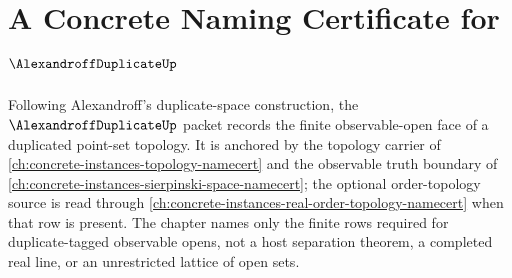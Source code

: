 \chapter{A Concrete Naming Certificate for $\AlexandroffDuplicateUp$}
\label{ch:concrete-instances-alexandroff-duplicate-namecert}

Following Alexandroff's duplicate-space construction, the $\AlexandroffDuplicateUp$ packet records the finite observable-open face of a duplicated point-set topology. It is anchored by the topology carrier of \autoref{ch:concrete-instances-topology-namecert} and the observable truth boundary of \autoref{ch:concrete-instances-sierpinski-space-namecert}; the optional order-topology source is read through \autoref{ch:concrete-instances-real-order-topology-namecert} when that row is present. The chapter names only the finite rows required for duplicate-tagged observable opens, not a host separation theorem, a completed real line, or an unrestricted lattice of open sets.

